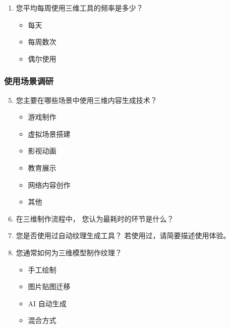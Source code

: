 {\begin{enumerate}
        \item 您平均每周使用三维工具的频率是多少？
        \begin{itemize}
            \setlength{\itemsep}{0pt}
            \item 每天
            \item 每周数次
            \item 偶尔使用
        \end{itemize}
    \end{enumerate}

    \vspace{0.3em}

    \subsubsection{使用场景调研}

    \begin{enumerate}
        \setcounter{enumi}{4}
        \setlength{\itemsep}{0pt}
        \setlength{\parskip}{0pt}

        \item 您主要在哪些场景中使用三维内容生成技术？
        \begin{itemize}
            \setlength{\itemsep}{0pt}
            \item 游戏制作
            \item 虚拟场景搭建
            \item 影视动画
            \item 教育展示
            \item 网络内容创作
            \item 其他
        \end{itemize}

        \item 在三维制作流程中，
        您认为最耗时的环节是什么？

        \item 您是否使用过自动纹理生成工具？
        若使用过，请简要描述使用体验。

        \item 您通常如何为三维模型制作纹理？
        \begin{itemize}
            \setlength{\itemsep}{0pt}
            \item 手工绘制
            \item 图片贴图迁移
            \item AI 自动生成
            \item 混合方式
        \end{itemize}
    \end{enumerate}

}
